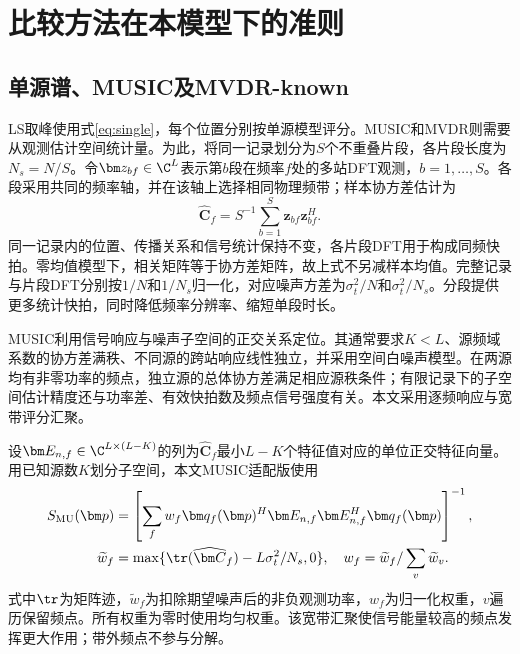 \section{比较方法在本模型下的准则}\label{app:baselines}
\subsection{单源谱、MUSIC及MVDR-known}
LS取峰使用式\eqref{eq:single}，每个位置分别按单源模型评分。MUSIC和MVDR则需要从观测估计空间统计量。为此，将同一记录划分为$S$个不重叠片段，各片段长度为$N_s=N/S$。令$\bm z_{bf}\in\C^L$表示第$b$段在频率$f$处的多站DFT观测，$b=1,\ldots,S$。各段采用共同的频率轴，并在该轴上选择相同物理频带；样本协方差估计为
\begin{equation}
 \widehat{\bm C}_f=S^{-1}\sum_{b=1}^S\bm z_{bf}\bm z_{bf}^H .
\end{equation}
同一记录内的位置、传播关系和信号统计保持不变，各片段DFT用于构成同频快拍。零均值模型下，相关矩阵等于协方差矩阵，故上式不另减样本均值。完整记录与片段DFT分别按$1/N$和$1/N_s$归一化，对应噪声方差为$\sigma_t^2/N$和$\sigma_t^2/N_s$。分段提供更多统计快拍，同时降低频率分辨率、缩短单段时长。

MUSIC利用信号响应与噪声子空间的正交关系定位\cite{WeissAmar2005}。其通常要求$K<L$、源频域系数的协方差满秩、不同源的跨站响应线性独立，并采用空间白噪声模型。在两源均有非零功率的频点，独立源的总体协方差满足相应源秩条件；有限记录下的子空间估计精度还与功率差、有效快拍数及频点信号强度有关。本文采用逐频响应与宽带评分汇聚。

设$\bm E_{n,f}\in\C^{L\times(L-K)}$的列为$\widehat{\bm C}_f$最小$L-K$个特征值对应的单位正交特征向量。用已知源数$K$划分子空间，本文MUSIC适配版使用
\begin{align}
 S_{\mathrm{MU}}(\bm p)&=\left[\sum_f w_f
 \bm q_f(\bm p)^H\bm E_{n,f}\bm E_{n,f}^H\bm q_f(\bm p)\right]^{-1},\label{eq:music}\\
 \widetilde w_f&=\max\{\tr(\widehat{\bm C}_f)-L\sigma_t^2/N_s,0\},\quad
 w_f=\widetilde w_f/\sum_v\widetilde w_v .\nonumber
\end{align}
式中$\tr$为矩阵迹，$\widetilde w_f$为扣除期望噪声后的非负观测功率，$w_f$为归一化权重，$v$遍历保留频点。所有权重为零时使用均匀权重。该宽带汇聚使信号能量较高的频点发挥更大作用；带外频点不参与分解。

